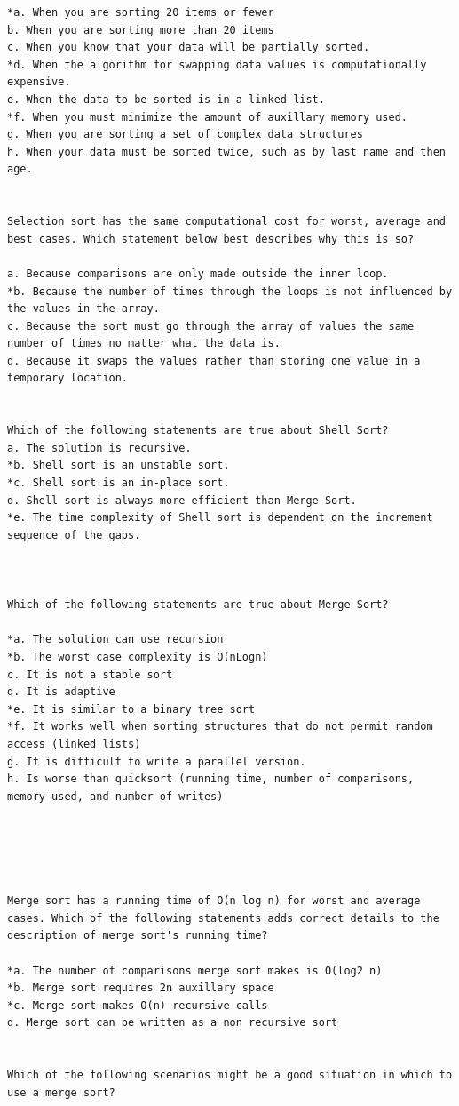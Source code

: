 \begin{verbatim}
*a. When you are sorting 20 items or fewer 
b. When you are sorting more than 20 items 
c. When you know that your data will be partially sorted. 
*d. When the algorithm for swapping data values is computationally expensive. 
e. When the data to be sorted is in a linked list. 
*f. When you must minimize the amount of auxillary memory used. 
g. When you are sorting a set of complex data structures 
h. When your data must be sorted twice, such as by last name and then age. 


Selection sort has the same computational cost for worst, average and best cases. Which statement below best describes why this is so? 

a. Because comparisons are only made outside the inner loop. 
*b. Because the number of times through the loops is not influenced by the values in the array. 
c. Because the sort must go through the array of values the same number of times no matter what the data is. 
d. Because it swaps the values rather than storing one value in a temporary location. 


Which of the following statements are true about Shell Sort?
a. The solution is recursive.
*b. Shell sort is an unstable sort.
*c. Shell sort is an in-place sort.
d. Shell sort is always more efficient than Merge Sort.
*e. The time complexity of Shell sort is dependent on the increment sequence of the gaps.



Which of the following statements are true about Merge Sort? 

*a. The solution can use recursion 
*b. The worst case complexity is O(nLogn) 
c. It is not a stable sort 
d. It is adaptive 
*e. It is similar to a binary tree sort 
*f. It works well when sorting structures that do not permit random access (linked lists) 
g. It is difficult to write a parallel version. 
h. Is worse than quicksort (running time, number of comparisons, memory used, and number of writes) 





Merge sort has a running time of O(n log n) for worst and average cases. Which of the following statements adds correct details to the description of merge sort's running time? 

*a. The number of comparisons merge sort makes is O(log2 n) 
*b. Merge sort requires 2n auxillary space 
*c. Merge sort makes O(n) recursive calls 
d. Merge sort can be written as a non recursive sort 


Which of the following scenarios might be a good situation in which to use a merge sort? 


\end{verbatim}
